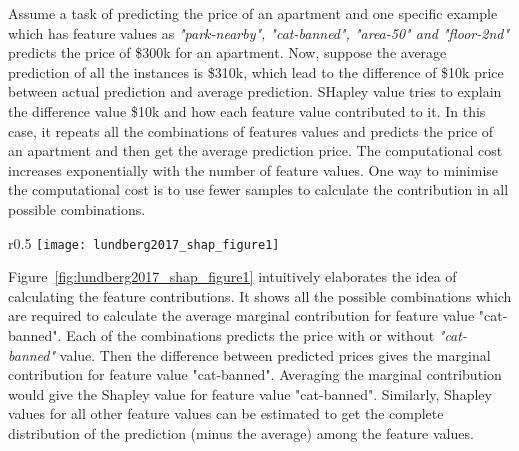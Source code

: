 \documentclass[english]{tktltiki2}
\theoremstyle{definition}
\theoremstyle{remark}
\begin{document}
Assume a task of predicting the price of an apartment and one specific example which has feature values as \textit{"park-nearby", "cat-banned", "area-50" and "floor-2nd"} predicts the price of \$300k for an apartment. Now, suppose the average prediction of all the instances is \$310k, which lead to the difference of \$10k price between actual prediction and average prediction. SHapley value tries to explain the difference value \$10k  and how each feature value contributed to it. In this case, it repeats all the combinations of features values and predicts the price of an apartment and then get the average prediction price. The computational cost increases exponentially with the number of feature values. One way to minimise the computational cost is to use fewer samples to calculate the contribution in all possible combinations.

\begin{wrapfigure}{r}{0.5\textwidth}
	\centering
	\vspace*{-2mm}
	\texttt{[image: lundberg2017\_shap\_figure1]}
	\vspace*{-10mm}
	\caption{SHapley value: \citep{molnarinterpretable}: All 8 combinations require to compute the Shapley value for feature value = "cat-banned".}
	\label{fig:lundberg2017_shap_figure1}
\end{wrapfigure}


Figure~\ref{fig:lundberg2017_shap_figure1} intuitively elaborates the idea of calculating the feature contributions. It shows all the possible combinations which are required to calculate the average marginal contribution for feature value "cat-banned". Each of the combinations predicts the price with or without \textit{"cat-banned"} value. Then the difference between predicted prices gives the marginal contribution for feature value "cat-banned".  Averaging the marginal contribution would give the Shapley value for feature value "cat-banned".  Similarly, Shapley values for all other feature values can be estimated to get the complete distribution of the prediction (minus the average) among the feature values.
\end{document}
